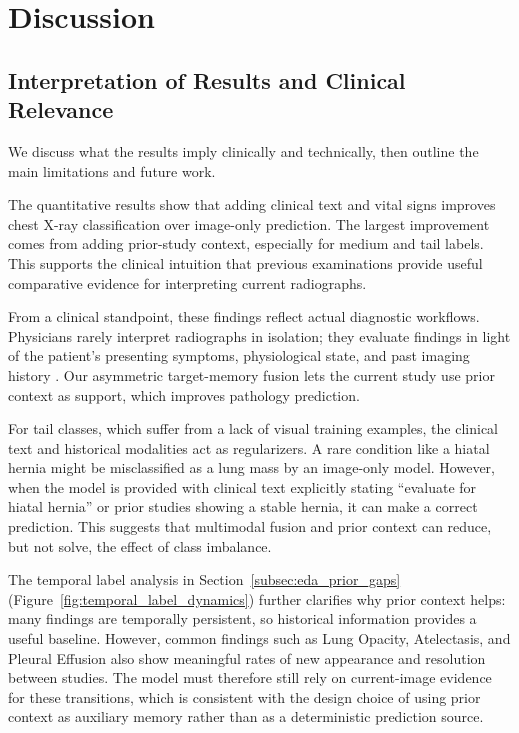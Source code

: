\section{Discussion}
\label{sec:discussion}

\subsection{Interpretation of Results and Clinical Relevance}
\label{subsec:discussion_interpretation}

We discuss what the results imply clinically and technically, then outline the main limitations and future work.

The quantitative results show that adding clinical text and vital signs improves chest X-ray classification over image-only prediction. The largest improvement comes from adding prior-study context, especially for medium and tail labels. This supports the clinical intuition that previous examinations provide useful comparative evidence for interpreting current radiographs.

From a clinical standpoint, these findings reflect actual diagnostic workflows. Physicians rarely interpret radiographs in isolation; they evaluate findings in light of the patient's presenting symptoms, physiological state, and past imaging history \cite{sloan2025camchex,bannur2023biovilt}. Our asymmetric target-memory fusion lets the current study use prior context as support, which improves pathology prediction.

For tail classes, which suffer from a lack of visual training examples, the clinical text and historical modalities act as regularizers. A rare condition like a hiatal hernia might be misclassified as a lung mass by an image-only model. However, when the model is provided with clinical text explicitly stating ``evaluate for hiatal hernia'' or prior studies showing a stable hernia, it can make a correct prediction. This suggests that multimodal fusion and prior context can reduce, but not solve, the effect of class imbalance.

The temporal label analysis in Section~\ref{subsec:eda_prior_gaps} (Figure~\ref{fig:temporal_label_dynamics}) further clarifies why prior context helps: many findings are temporally persistent, so historical information provides a useful baseline. However, common findings such as Lung Opacity, Atelectasis, and Pleural Effusion also show meaningful rates of new appearance and resolution between studies. The model must therefore still rely on current-image evidence for these transitions, which is consistent with the design choice of using prior context as auxiliary memory rather than as a deterministic prediction source.


